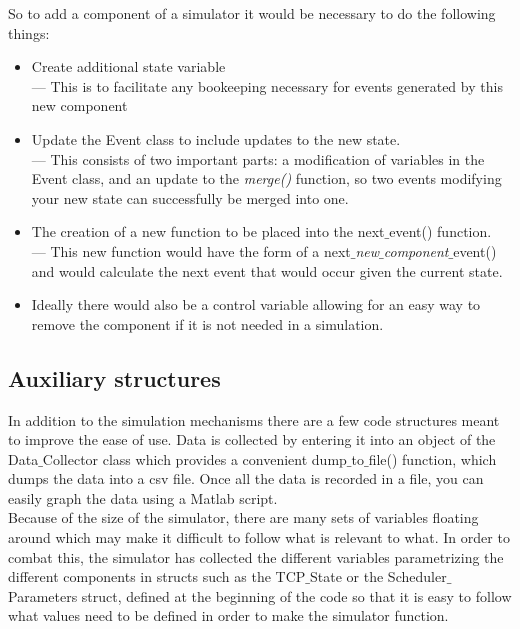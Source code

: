 \documentclass[11pt]{article}%
\begin{document}
So to add a component of a simulator it would be necessary to do the following things:
\begin{itemize}
\item Create additional state variable\\
--- This is to facilitate any bookeeping necessary for events generated by this new component
\item Update the Event class to include updates to the new state.\\
--- This consists of two important parts: a modification of variables in the Event class, and an update to the {\it merge()} function, so two events modifying your new state can successfully be merged into one.
\item The creation of a new function to be placed into the next$\_$event() function.\\
--- This new function would have the form of a next$\_${\it new$\_$component}$\_$event() and would calculate the next event that would occur given the current state.
\item Ideally there would also be a control variable allowing for an easy way to remove the component if it is not needed in a simulation.
\end{itemize}
\subsection{Auxiliary structures}
In addition to the simulation mechanisms there are a few code structures meant to improve the ease of use.  Data is collected by entering it into an object of the Data$\_$Collector class which provides a convenient dump$\_$to$\_$file() function, which dumps the data into a csv file.  Once all the data is recorded in a file, you can easily graph the data using a Matlab script.\\

Because of the size of the simulator, there are many sets of variables floating around which may make it difficult to follow what is relevant to what.  In order to combat this, the simulator has collected the different variables parametrizing the different components in structs such as the TCP$\_$State or the Scheduler$\_$Parameters struct, defined at the beginning of the code so that it is easy to follow what values need to be defined in order to make the simulator function.\\
\end{document}
